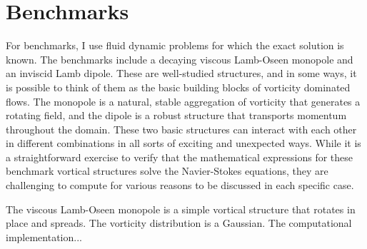 \documentclass[12pt]{report}
\begin{document}
\section{Benchmarks}

For benchmarks, I use fluid dynamic problems for which the exact solution is
known.  The benchmarks include a decaying viscous Lamb-Oseen monopole and an
inviscid Lamb dipole.  These are well-studied structures, and in some ways, it
is possible to think of them as the basic building blocks of vorticity
dominated flows.  The monopole is a natural, stable aggregation of vorticity
that generates a rotating field, and the dipole is a robust structure that 
transports momentum throughout the domain.  These two basic structures can
interact with each other in different combinations in all sorts of exciting
and unexpected ways.  While it is a straightforward exercise to verify that the
mathematical expressions for these benchmark vortical structures solve
the Navier-Stokes equations, they are challenging to compute for various
reasons to be discussed in each specific case.

The viscous Lamb-Oseen monopole is a simple vortical structure that rotates in
place and spreads.  The vorticity distribution is a Gaussian.  The
computational implementation...
\end{document}

